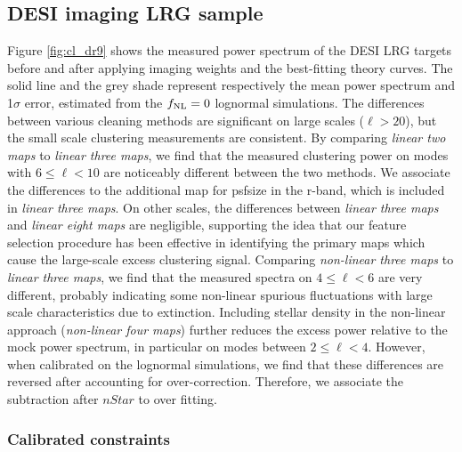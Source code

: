 \subsection{DESI imaging LRG sample}
Figure \ref{fig:cl_dr9} shows the measured power spectrum of the DESI LRG targets before and after applying imaging weights and the best-fitting theory curves. The solid line and the grey shade represent respectively the mean power spectrum and 1$\sigma$ error, estimated from the $f_{\rm NL}=0$ lognormal simulations. The differences between various cleaning methods are significant on large scales ($\ell > 20$), but the small scale clustering measurements are consistent. By comparing \textit{linear two maps} to \textit{linear three maps}, we find that the measured clustering power on modes with $6\leq \ell < 10$ are noticeably different between the two methods. We associate the differences to the additional map for psfsize in the r-band, which is included in \textit{linear three maps}. On other scales, the differences between \textit{linear three maps} and \textit{linear eight maps} are negligible, supporting the idea that our feature selection procedure has been effective in identifying the primary maps which cause the large-scale excess clustering signal. Comparing \textit{non-linear three maps} to \textit{linear three maps}, we find that the measured spectra on $4 \leq \ell < 6$ are very different, probably indicating some non-linear spurious fluctuations with large scale characteristics due to extinction. Including stellar density in the non-linear approach (\textit{non-linear four maps}) further reduces the excess power relative to the mock power spectrum, in particular on modes between $2\leq \ell < 4$. However, when calibrated on the lognormal simulations, we find that these differences are reversed after accounting for over-correction. Therefore, we associate the subtraction after $nStar$ to over fitting.


\subsubsection{Calibrated constraints}

